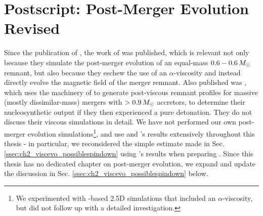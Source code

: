 \section{Postscript: Post-Merger Evolution Revised}
\label{sec:c2_postscript}

Since the publication of \citeal{zhu+13}, the work of \cite{ji+13} was published, which is relevant not only because they simulate the post-merger evolution of an equal-mass $0.6-0.6\,\Msun$ remnant, but also because they eschew the use of an $\alpha$-viscosity and instead directly evolve the magnetic field of the merger remnant.  Also published was \cite{rask+14}, which uses the machinery of \cite{schw+12} to generate post-viscous remnant profiles for massive (mostly dissimilar-mass) mergers with $>0.9\,\Msun$ accretors, to determine their nucleosynthetic output if they then experienced a pure detonation.  They do not discuss their viscous simulations in detail.  We have not performed our own post-merger evolution simulations\footnote{We experimented with \flash-based 2.5D simulations that included an $\alpha$-viscosity, but did not follow up with a detailed investigation.}, and use \cite{schw+12} and \cite{ji+13}'s results extensively throughout this thesis - in particular, we reconsidered the simple estimate made in Sec. \ref{ssec:ch2_viscevo_possiblespindown} using \cite{ji+13}'s results when preparing \citeal{zhu+16}.  Since this thesis has no dedicated chapter on post-merger evolution, we expand and update the discussion in Sec. \ref{ssec:ch2_viscevo_possiblespindown} below.


